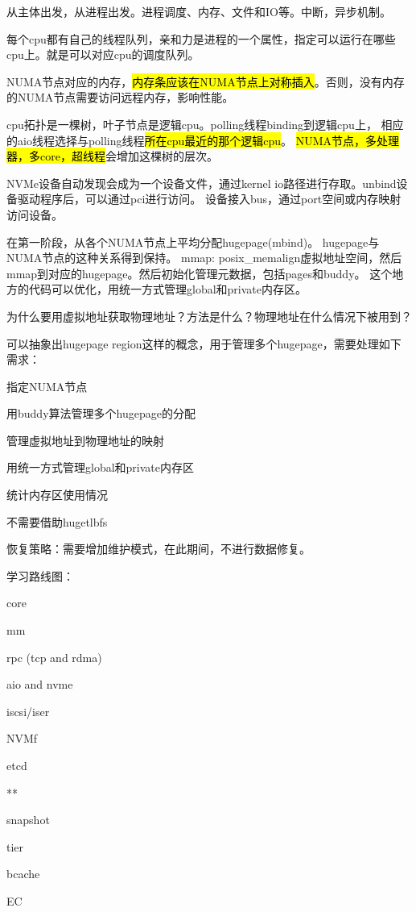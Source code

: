 从主体出发，从进程出发。进程调度、内存、文件和IO等。中断，异步机制。

每个cpu都有自己的线程队列，亲和力是进程的一个属性，指定可以运行在哪些cpu上。就是可以对应cpu的调度队列。

NUMA节点对应的内存，\hl{内存条应该在NUMA节点上对称插入}。否则，没有内存的NUMA节点需要访问远程内存，影响性能。

cpu拓扑是一棵树，叶子节点是逻辑cpu。polling线程binding到逻辑cpu上，
相应的aio线程选择与polling线程\hl{所在cpu最近的那个逻辑cpu}。
\hl{NUMA节点，多处理器，多core，超线程}会增加这棵树的层次。

NVMe设备自动发现会成为一个设备文件，通过kernel io路径进行存取。unbind设备驱动程序后，可以通过pci进行访问。
设备接入bus，通过port空间或内存映射访问设备。

在第一阶段，从各个NUMA节点上平均分配hugepage(mbind)。 hugepage与NUMA节点的这种关系得到保持。
mmap: posix\_memalign虚拟地址空间，然后mmap到对应的hugepage。然后初始化管理元数据，包括pages和buddy。
这个地方的代码可以优化，用统一方式管理global和private内存区。

为什么要用虚拟地址获取物理地址？方法是什么？物理地址在什么情况下被用到？

可以抽象出hugepage region这样的概念，用于管理多个hugepage，需要处理如下需求：
\begin{enumbox}
\item 指定NUMA节点
\item 用buddy算法管理多个hugepage的分配
\item 管理虚拟地址到物理地址的映射
\item 用统一方式管理global和private内存区
\item 统计内存区使用情况
\item 不需要借助hugetlbfs
\end{enumbox}

恢复策略：需要增加维护模式，在此期间，不进行数据修复。

学习路线图：
\begin{enumbox}
\item core
\item mm
\item rpc (tcp and rdma)
\item aio and nvme
\item iscsi/iser
\item NVMf
\item etcd
\item ***
\item snapshot
\item tier
\item bcache
\item EC
\end{enumbox}

